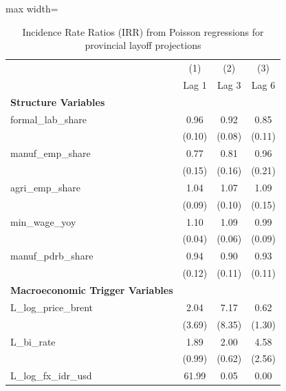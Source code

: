 \begin{table}[H]\centering
\caption{Incidence Rate Ratios (IRR) from Poisson regressions for provincial layoff projections}
\small
\renewcommand{\arraystretch}{1.15}
\begin{adjustbox}{max width=\textwidth}
\begin{tabular}{l*{3}{c}}
\toprule
& (1) & (2) & (3) \\
& Lag 1 & Lag 3 & Lag 6 \\ \midrule
\addlinespace\textbf{Structure Variables}&                     &                     &                     \\
formal\_lab\_share&        0.96         &        0.92         &        0.85         \\
            &      (0.10)         &      (0.08)         &      (0.11)         \\
manuf\_emp\_share&        0.77         &        0.81         &        0.96         \\
            &      (0.15)         &      (0.16)         &      (0.21)         \\
agri\_emp\_share&        1.04         &        1.07         &        1.09         \\
            &      (0.09)         &      (0.10)         &      (0.15)         \\
min\_wage\_yoy&        1.10\sym{**} &        1.09         &        0.99         \\
            &      (0.04)         &      (0.06)         &      (0.09)         \\
manuf\_pdrb\_share&        0.94         &        0.90         &        0.93         \\
            &      (0.12)         &      (0.11)         &      (0.11)         \\
\addlinespace\textbf{Macroeconomic Trigger Variables}&                     &                     &                     \\
L\_log\_price\_brent&        2.04         &        7.17         &        0.62         \\
            &      (3.69)         &      (8.35)         &      (1.30)         \\
L\_bi\_rate   &        1.89         &        2.00\sym{*}  &        4.58\sym{**} \\
            &      (0.99)         &      (0.62)         &      (2.56)         \\
L\_log\_fx\_idr\_usd&       61.99         &        0.05         &        0.00         \\

\end{tabular}
\end{adjustbox}
\end{table}
